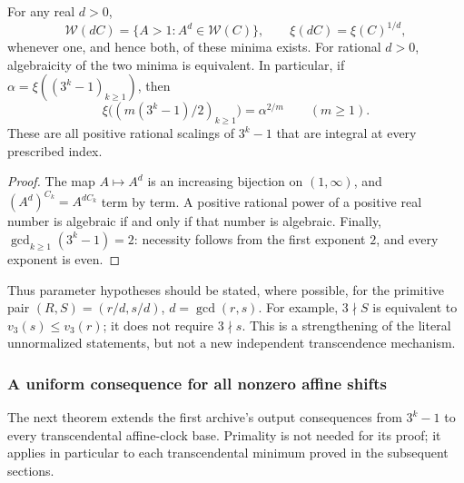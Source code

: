 \documentclass[11pt,a4paper]{article}
\theoremstyle{definition}\newtheorem{definition}[theorem]{Definition}
\theoremstyle{remark}\newtheorem{remark}[theorem]{Remark}
\begin{document}
\begin{proposition}\label{init:scaling}
For any real $d>0$,
\[
 \mathcal W(dC)=\{A>1:A^d\in\mathcal W(C)\},\qquad
 \xi(dC)=\xi(C)^{1/d},
\]
whenever one, and hence both, of these minima exists.
For rational $d>0$, algebraicity of the two minima is equivalent.
In particular, if $\alpha=\xi((3^k-1)_{k\ge1})$, then
\[
 \xi\bigl((m(3^k-1)/2)_{k\ge1}\bigr)=\alpha^{2/m}
 \qquad(m\ge1).
\]
These are all positive rational scalings of $3^k-1$ that are integral
at every prescribed index.
\end{proposition}
\begin{proof}
The map $A\mapsto A^d$ is an increasing bijection on $(1,\infty)$,
and $(A^d)^{C_k}=A^{dC_k}$ term by term. A positive rational power
of a positive real number is algebraic if and only if that number is
algebraic. Finally, $\gcd_{k\ge1}(3^k-1)=2$: necessity follows from
the first exponent $2$, and every exponent is even.
\end{proof}

Thus parameter hypotheses should be stated, where possible, for the
primitive pair $(R,S)=(r/d,s/d)$, $d=\gcd(r,s)$. For example,
$3\nmid S$ is equivalent to $v_3(s)\le v_3(r)$; it does not require
$3\nmid s$. This is a strengthening of the literal unnormalized
statements, but not a new independent transcendence mechanism.

\subsubsection{A uniform consequence for all nonzero affine shifts}

The next theorem extends the first archive's output consequences from
$3^k-1$ to every transcendental affine-clock base. Primality is not needed
for its proof; it applies in particular to each transcendental minimum
proved in the subsequent sections.
\end{document}
